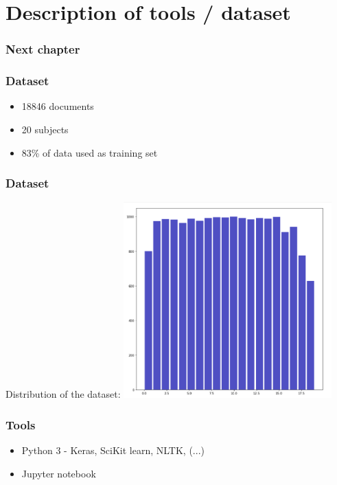 \documentclass{beamer}
\begin{document}
    \section{Description of tools / dataset}
    \begin{frame}
    	\frametitle{Next chapter}
        \tableofcontents[currentsection]
    \end{frame}
    \begin{frame}
        \frametitle{Dataset}
        \begin{itemize}
            \item 18846 documents
            \item 20 subjects
            \item 83\% of data used as training set
        \end{itemize}
    \end{frame}
    \begin{frame}
        \frametitle{Dataset}
        \centering
        Distribution of the dataset:
        \includegraphics[width=0.6\textwidth]{data_distribution.png}
    \end{frame}
    \begin{frame}
    	\frametitle{Tools}
        \begin{itemize}
            \item Python 3 - Keras, SciKit learn, NLTK, (...)
            \item Jupyter notebook
        \end{itemize}
    \end{frame}
\end{document}
